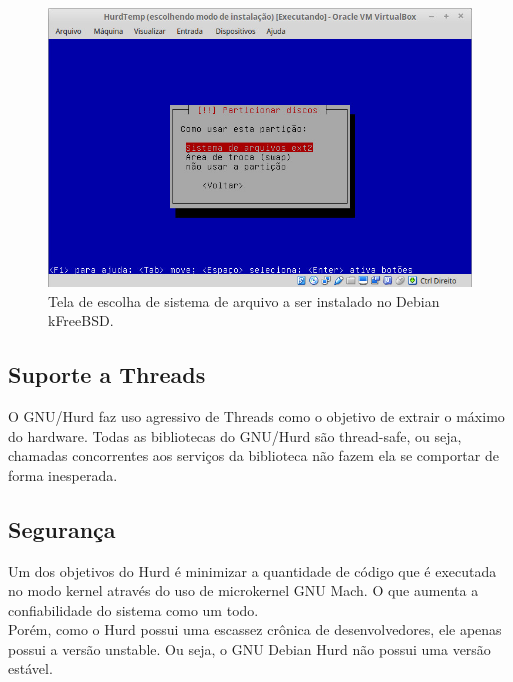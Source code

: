 \documentclass[conference]{IEEEtran}
\begin{document}
\begin{figure}[h!]
	\centering
	\includegraphics[scale=0.35]{SistemasArquivosHurd.jpeg}
	\caption{Tela de escolha de sistema de arquivo a ser instalado no Debian kFreeBSD.}
	\label{fig:SisAqrLinux}
\end{figure}
\subsection{Suporte a Threads}\label{sec:HurdThreads}
O GNU/Hurd faz uso agressivo de Threads como o objetivo de extrair o máximo do hardware.\cite{Hurd} Todas as bibliotecas do GNU/Hurd são thread-safe, ou seja, chamadas concorrentes aos serviços da biblioteca não fazem ela se comportar de forma inesperada.
\subsection{Segurança}\label{sec:HurdSec}
Um dos objetivos do Hurd é minimizar a quantidade de código que é executada no modo kernel através do uso de microkernel GNU Mach. O que aumenta a confiabilidade do sistema como um todo.\\

Porém, como o Hurd possui uma escassez crônica de desenvolvedores, ele apenas possui a versão unstable. Ou seja, o GNU Debian Hurd não possui uma versão estável.



\end{document}
